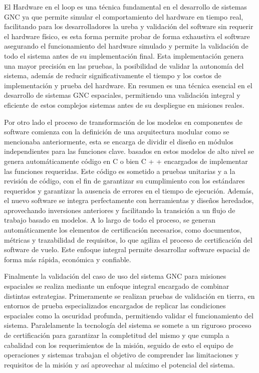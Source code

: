 \documentclass[12pt]{article}
\begin{document}
El Hardware en el loop es una técnica fundamental en el desarrollo de sistemas GNC ya que permite simular el comportamiento del hardware en tiempo real, facilitando para los desarrolladores la ureba y validación del software sin requerir el hardware físico, es esta forma permite probar de forma exhaustiva el software asegurando el funcionamiento del hardware simulado y permite la validación de todo el sistema antes de su implementación final. Esta implementación genera una mayor precisión en las pruebas, la posibilidad de validar la autonomía del sistema, además de reducir significativamente el tiempo y los costos de implementación y prueba del hardware. En resumen es una técnica esencial en el desarrollo de sistemas GNC espaciales, permitiendo una validación integral y eficiente de estos complejos sistemas antes de su despliegue en misiones reales.

Por otro lado el proceso de transformación de los modelos en componentes de software comienza con la definición de una arquitectura modular como se mencionaba anteriormente, esta se encarga de dividir el diseño en módulos independientes para las funciones clave. basados en estos modelos de alto nivel se genera automáticamente código en C o bien C + + encargados de implementar las funciones requeridas. Este código es sometido a pruebas unitarias y a la revisión de código, con el fin de garantizar su cumplimiento con los estándares requeridos y garantizar la ausencia de errores en el tiempo de ejecución. Además, el nuevo software se integra perfectamente con herramientas y diseños heredados, aprovechando inversiones anteriores y facilitando la transición a un flujo de trabajo basado en modelos. A lo largo de todo el proceso, se generan automáticamente los elementos de certificación necesarios, como documentos, métricas y trazabilidad de requisitos, lo que agiliza el proceso de certificación del software de vuelo. Este enfoque integral permite desarrollar software espacial de forma más rápida, económica y confiable.

Finalmente la validación del caso de uso del sistema GNC para misiones espaciales se realiza mediante un enfoque integral encargado de combinar distintas estrategias. Primeramente se realizan pruebas de validación en tierra, en entornos de prueba especializados encargados de replicar las condiciones espaciales como la oscuridad profunda, permitiendo validar el funcionamiento del sistema. Paralelamente la tecnología del sistema se somete a un riguroso proceso de certificación para garantizar la completitud del mismo y que cumpla a cabalidad con los requerimientos de la misión, seguido de esto el equipo de operaciones y sistemas trabajan el objetivo de comprender las limitaciones y requisitos de la misión y así aprovechar al máximo el potencial del sistema.
\end{document}

